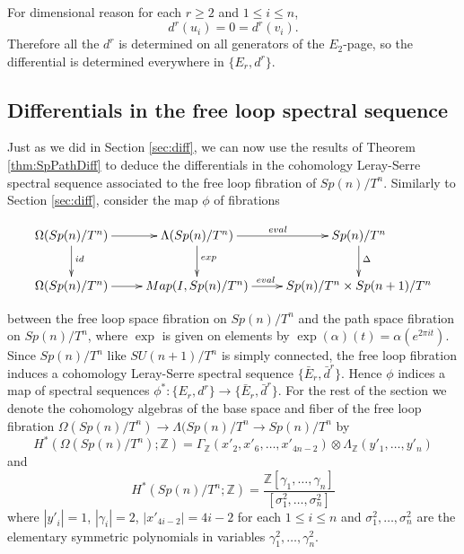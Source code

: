 \documentclass{article}
\theoremstyle{plain}
\theoremstyle{definition}
\numberwithin{thm}{section}
\begin{document}
		For dimensional reason for each $r \geq 2$ and $1\leq i\leq n$,
		\begin{equation*}
			d^r(u_i)=0=d^r(v_i).
		\end{equation*}
		Therefore all the $d^r$ is determined on all generators of the $E_2$-page, so the differential is determined everywhere in $\{ E_r, d^r \}$.
		
	\subsection{Differentials in the free loop spectral sequence}
		
		Just as we did in Section \ref{sec:diff},
		we can now use the results of Theorem \ref{thm:SpPathDiff} to deduce the differentials in the 
		cohomology Leray-Serre spectral sequence associated to the free loop fibration of $Sp(n)/T^n$.
		Similarly to Section \ref{sec:diff}, consider the map $\phi$ of fibrations
		
		\begin{equation*}\label{fig:fibcd}
						\xymatrix{
							{\Omega(Sp(n)/T^n)} \ar[r]^(.5){} \ar[d]^(.45){id} & {\Lambda(Sp(n)/T^n)} \ar[r]^{eval} \ar[d]^(.45){exp}  & {Sp(n)/T^n} \ar[d]^(.45){\Delta} \\
							{\Omega(Sp(n)/T^n)} \ar[r]^(.45){}   							 & {Map(I,Sp(n)/T^n)} 	 \ar[r]^(.425){eval}  					 & {Sp(n)/T^n\times Sp(n+1)/T^n} }
		\end{equation*}
		
		
		between the free loop space fibration on $Sp(n)/T^n$ and the path space fibration on $Sp(n)/T^n$,
		where $\exp$ is given on elements by $\exp(\alpha)(t)=\alpha(e^{2\pi i t})$.
		Since $Sp(n)/T^n$ like $SU(n+1)/T^n$ is simply connected, the free loop fibration induces a cohomology Leray-Serre spectral sequence $\{\bar{E}_r, \bar{d}^r \}$.
		Hence $\phi$ indices a map of spectral sequences $\phi^*\colon \{ E_r,d^r \} \to \{\bar{E}_r, \bar{d}^r \}$.
		For the rest of the section we denote the cohomology algebras of the base space and fiber of the
		free loop fibration $\Omega(Sp(n)/T^n)\to \Lambda(Sp(n)/T^n \to Sp(n)/T^n$ by
		\begin{equation}\label{eq:spLoppCoHomology}
			H^*(\Omega(Sp(n)/T^n);\mathbb{Z})=\Gamma_{\mathbb{Z}}(x'_2,x'_6,\dots,x'_{4n-2})\otimes \Lambda_{\mathbb{Z}}(y'_1,\dots,y'_n)
		\end{equation}
		and
		\begin{equation*}
			H^*(Sp(n)/T^n;\mathbb{Z})=\frac{\mathbb{Z}[\gamma_1,\dots,\gamma_n]}{[\sigma_1^2,\dots,\sigma_{n}^2]}
		\end{equation*}
		where $|{y'}_i|=1$, $|\gamma_i|=2$, $|x'_{4i-2}|=4i-2$ for each $1\leq i\leq n$ and $\sigma_1^2,\dots,\sigma_n^2$ 
		are the elementary symmetric polynomials in variables $\gamma_1^2,\dots,\gamma_n^2$.
		
\end{document}
